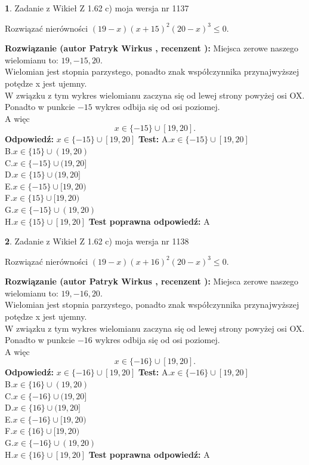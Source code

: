 \documentclass[12pt, a4paper]{article}
\theoremstyle{definition} %
\newtheorem{zad}{}
\newcommand{\zadStart}[1]{\begin{zad}#1\newline}
\newcommand{\zadStop}{\end{zad}}
\newcommand{\rozwStart}[2]{\noindent \textbf{Rozwiązanie (autor #1 , recenzent #2): }\newline}
\newcommand{\rozwStop}{\newline}
\newcommand{\odpStart}{\noindent \textbf{Odpowiedź:}\newline}
\newcommand{\odpStop}{\newline}
\newcommand{\testStart}{\noindent \textbf{Test:}\newline}
\newcommand{\testStop}{\newline}
\newcommand{\kluczStart}{\noindent \textbf{Test poprawna odpowiedź:}\newline}
\newcommand{\kluczStop}{\newline}
\begin{document}
\zadStart{Zadanie z Wikieł Z 1.62 c) moja wersja nr 1137}

Rozwiązać nierówności $(19-x)(x+15)^{2}(20-x)^{3}\le0$.
\zadStop
\rozwStart{Patryk Wirkus}{}
Miejsca zerowe naszego wielomianu to: $19, -15, 20$.\\
Wielomian jest stopnia parzystego, ponadto znak współczynnika przy\linebreak najwyższej potędze x jest ujemny.\\ W związku z tym wykres wielomianu zaczyna się od lewej strony powyżej osi OX.\\
Ponadto w punkcie $-15$ wykres odbija się od osi poziomej.\\
A więc $$x \in \{-15\} \cup [19,20].$$
\rozwStop
\odpStart
$x \in \{-15\} \cup [19,20]$
\odpStop
\testStart
A.$x \in \{-15\} \cup [19,20]$\\
B.$x \in \{15\} \cup (19,20)$\\
C.$x \in \{-15\} \cup (19,20]$\\
D.$x \in \{15\} \cup (19,20]$\\
E.$x \in \{-15\} \cup [19,20)$\\
F.$x \in \{15\} \cup [19,20)$\\
G.$x \in \{-15\} \cup (19,20)$\\
H.$x \in \{15\} \cup [19,20]$
\testStop
\kluczStart
A
\kluczStop



\zadStart{Zadanie z Wikieł Z 1.62 c) moja wersja nr 1138}

Rozwiązać nierówności $(19-x)(x+16)^{2}(20-x)^{3}\le0$.
\zadStop
\rozwStart{Patryk Wirkus}{}
Miejsca zerowe naszego wielomianu to: $19, -16, 20$.\\
Wielomian jest stopnia parzystego, ponadto znak współczynnika przy\linebreak najwyższej potędze x jest ujemny.\\ W związku z tym wykres wielomianu zaczyna się od lewej strony powyżej osi OX.\\
Ponadto w punkcie $-16$ wykres odbija się od osi poziomej.\\
A więc $$x \in \{-16\} \cup [19,20].$$
\rozwStop
\odpStart
$x \in \{-16\} \cup [19,20]$
\odpStop
\testStart
A.$x \in \{-16\} \cup [19,20]$\\
B.$x \in \{16\} \cup (19,20)$\\
C.$x \in \{-16\} \cup (19,20]$\\
D.$x \in \{16\} \cup (19,20]$\\
E.$x \in \{-16\} \cup [19,20)$\\
F.$x \in \{16\} \cup [19,20)$\\
G.$x \in \{-16\} \cup (19,20)$\\
H.$x \in \{16\} \cup [19,20]$
\testStop
\kluczStart
A
\kluczStop
\end{document}
